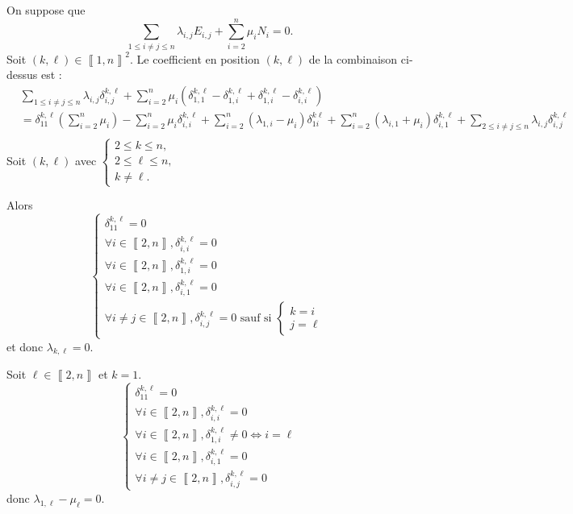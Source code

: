\begin{enumerate}
\begin{enumerate}
				On suppose que \[
					\sum_{1 \le i \neq j \le n} \lambda_{i,j}E_{i,j} + \sum_{i=2}^{n} \mu_i N_i = 0.
				\] Soit $(k, \ell) \in \left\llbracket 1,n \right\rrbracket^2$. Le coefficient en position $(k,\ell)$ de la combinaison ci-dessus est :
				\begin{align*}
					&\sum_{1 \le i \neq j \le n} \lambda_{i,j} \delta^{k,\ell}_{i,j}
					+\sum_{i=2}^{n} \mu_i\left( \delta_{1,1}^{k,\ell} - \delta_{1,i}^{k,\ell} + \delta_{1,i}^{k,\ell} - \delta_{i,i}^{k,\ell} \right) \\
					&= \delta_{11}^{k,\ell} \left( \sum_{i=2}^{n} \mu_i \right) - \sum_{i=2}^{n}\mu_i \delta_{i,i}^{k,\ell} + \sum_{i=2}^{n}(\lambda_{1,i} -\mu_i) \delta_{1i}^{k\ell} + \sum_{i=2}^{n}(\lambda_{i,1} + \mu_i) \delta_{i,1}^{k,\ell} + \sum_{2 \le i \neq j \le n} \lambda_{i,j}\delta_{i,j}^{k,\ell} \\ 
				\end{align*}
				Soit $(k,\ell)$ avec $\begin{cases}
					2 \le k\le n,\\
					2\le \ell\le n,\\
					k \neq \ell.
				\end{cases}$

				Alors \[
					\begin{cases}
						\delta_{11}^{k,\ell}= 0\\
						\forall i \in \left\llbracket 2,n \right\rrbracket, \delta_{i,i}^{k,\ell} = 0\\
						\forall i \in \left\llbracket 2,n \right\rrbracket, \delta_{1,i}^{k,\ell} = 0\\
						\forall i \in \left\llbracket 2,n \right\rrbracket, \delta_{i,1}^{k,\ell} = 0\\
						\forall i \neq j \in \left\llbracket 2,n \right\rrbracket, \delta_{i,j}^{k,\ell} = 0 \text{ sauf si } \begin{cases}
							k = i\\
							j = \ell
						\end{cases}
					\end{cases}
				\] et donc $\lambda_{k,\ell} = 0$.

				Soit $\ell \in \left\llbracket 2,n \right\rrbracket$ et $k = 1$.\[
					\begin{cases}
						\delta_{11}^{k,\ell} = 0\\
						\forall i \in \left\llbracket 2,n \right\rrbracket, \delta_{i,i}^{k,\ell} = 0\\
						\forall i \in \left\llbracket 2,n \right\rrbracket, \delta_{1,i}^{k,\ell} \neq 0 \iff i = \ell\\
						\forall i \in \left\llbracket 2,n \right\rrbracket, \delta_{i,1}^{k,\ell} = 0\\
						\forall i \neq j \in \left\llbracket 2,n \right\rrbracket, \delta_{i,j}^{k,\ell} = 0
					\end{cases}
				\] donc $\lambda_{1,\ell} - \mu_\ell = 0$.
				

\end{enumerate}
\end{enumerate}

